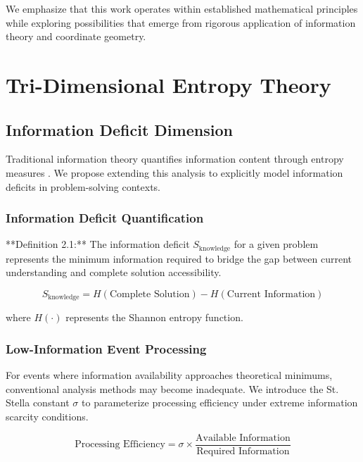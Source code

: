 \documentclass[12pt,a4paper]{article}
\begin{document}
We emphasize that this work operates within established mathematical principles while exploring possibilities that emerge from rigorous application of information theory and coordinate geometry.

\section{Tri-Dimensional Entropy Theory}

\subsection{Information Deficit Dimension}

Traditional information theory quantifies information content through entropy measures \cite{shannon1948mathematical}. We propose extending this analysis to explicitly model information deficits in problem-solving contexts.

\subsubsection{Information Deficit Quantification}

**Definition 2.1:** The information deficit $S_{\text{knowledge}}$ for a given problem represents the minimum information required to bridge the gap between current understanding and complete solution accessibility.

\begin{equation}
S_{\text{knowledge}} = H(\text{Complete Solution}) - H(\text{Current Information})
\label{eq:information_deficit}
\end{equation}

where $H(\cdot)$ represents the Shannon entropy function.

\subsubsection{Low-Information Event Processing}

For events where information availability approaches theoretical minimums, conventional analysis methods may become inadequate. We introduce the St. Stella constant $\sigma$ to parameterize processing efficiency under extreme information scarcity conditions.

\begin{equation}
\text{Processing Efficiency} = \sigma \times \frac{\text{Available Information}}{\text{Required Information}}
\label{eq:stella_constant}
\end{equation}
\end{document}

